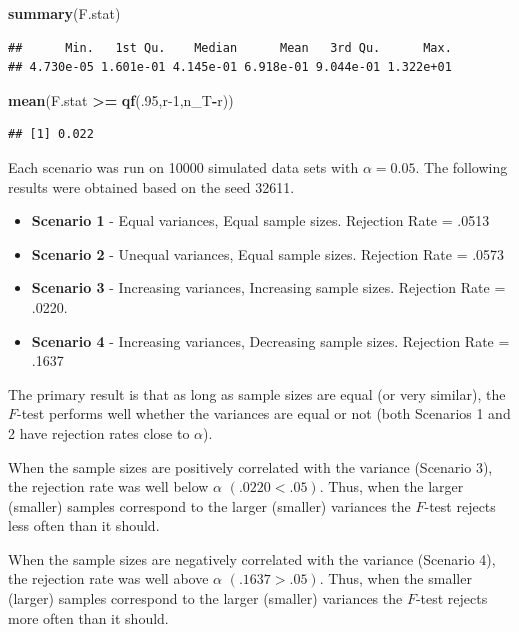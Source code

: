 \documentclass[
]{book}
\newenvironment{Shaded}{\begin{snugshade}}{\end{snugshade}}
\newcommand{\DecValTok}[1]{\textcolor[rgb]{0.00,0.00,0.81}{#1}}
\newcommand{\FunctionTok}[1]{\textcolor[rgb]{0.13,0.29,0.53}{\textbf{#1}}}
\newcommand{\NormalTok}[1]{#1}
\newcommand{\SpecialCharTok}[1]{\textcolor[rgb]{0.81,0.36,0.00}{\textbf{#1}}}
\providecommand{\tightlist}{%
  \setlength{\itemsep}{0pt}\setlength{\parskip}{0pt}}
\begin{document}
\begin{Shaded}
\begin{Highlighting}[]
\FunctionTok{summary}\NormalTok{(F.stat)}
\end{Highlighting}
\end{Shaded}

\begin{verbatim}
##      Min.   1st Qu.    Median      Mean   3rd Qu.      Max. 
## 4.730e-05 1.601e-01 4.145e-01 6.918e-01 9.044e-01 1.322e+01
\end{verbatim}

\begin{Shaded}
\begin{Highlighting}[]
\FunctionTok{mean}\NormalTok{(F.stat }\SpecialCharTok{\textgreater{}=} \FunctionTok{qf}\NormalTok{(.}\DecValTok{95}\NormalTok{,r}\DecValTok{{-}1}\NormalTok{,n\_T}\SpecialCharTok{{-}}\NormalTok{r))}
\end{Highlighting}
\end{Shaded}

\begin{verbatim}
## [1] 0.022
\end{verbatim}

Each scenario was run on 10000 simulated data sets with \(\alpha=0.05\).
The following results were obtained based on the seed 32611.

\begin{itemize}
\tightlist
\item
  \textbf{Scenario 1} - Equal variances, Equal sample sizes. Rejection
  Rate = .0513
\item
  \textbf{Scenario 2} - Unequal variances, Equal sample sizes. Rejection
  Rate = .0573
\item
  \textbf{Scenario 3} - Increasing variances, Increasing sample sizes.
  Rejection Rate = .0220.
\item
  \textbf{Scenario 4} - Increasing variances, Decreasing sample sizes.
  Rejection Rate = .1637
\end{itemize}

The primary result is that as long as sample sizes are equal (or very
similar), the \(F\)-test performs well whether the variances are equal
or not (both Scenarios 1 and 2 have rejection rates close to
\(\alpha\)).

When the sample sizes are positively correlated with the variance
(Scenario 3), the rejection rate was well below \(\alpha\)
\((.0220<.05)\). Thus, when the larger (smaller) samples correspond to
the larger (smaller) variances the \(F\)-test rejects less often than it
should.

When the sample sizes are negatively correlated with the variance
(Scenario 4), the rejection rate was well above \(\alpha\)
\((.1637>.05)\). Thus, when the smaller (larger) samples correspond to
the larger (smaller) variances the \(F\)-test rejects more often than it
should.
\end{document}
